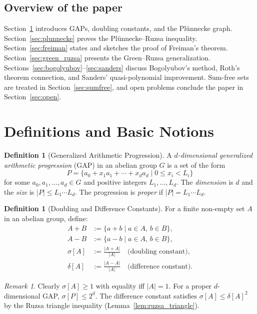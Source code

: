 \documentclass[12pt,a4paper]{amsart}
\theoremstyle{definition}
\newtheorem{definition}[theorem]{Definition}
\theoremstyle{remark}
\newtheorem{remark}[theorem]{Remark}
\begin{document}
\subsection{Overview of the paper}

Section~\ref{sec:definitions} introduces GAPs, doubling constants, and the
Plünnecke graph. Section~\ref{sec:plunnecke} proves the Plünnecke--Ruzsa
inequality. Section~\ref{sec:freiman} states and sketches the proof of Freiman's
theorem. Section~\ref{sec:green_ruzsa} presents the Green--Ruzsa generalization.
Sections~\ref{sec:bogolyubov}--\ref{sec:sanders} discuss Bogolyubov's method,
Roth's theorem connection, and Sanders' quasi-polynomial improvement. Sum-free
sets are treated in Section~\ref{sec:sumfree}, and open problems conclude the
paper in Section~\ref{sec:open}.

\section{Definitions and Basic Notions}\label{sec:definitions}

\begin{definition}[Generalized Arithmetic Progression]
A \emph{$d$-dimensional generalized arithmetic progression} (GAP) in an abelian
group $G$ is a set of the form
\[
  P = \{a_0 + x_1 a_1 + \cdots + x_d a_d \mid 0 \leq x_i < L_i\}
\]
for some $a_0, a_1, \ldots, a_d \in G$ and positive integers $L_1, \ldots, L_d$.
The \emph{dimension} is $d$ and the \emph{size} is $|P| \leq L_1 \cdots L_d$.
The progression is \emph{proper} if $|P| = L_1 \cdots L_d$.
\end{definition}

\begin{definition}[Doubling and Difference Constants]
For a finite non-empty set $A$ in an abelian group, define:
\begin{align*}
  A + B &:= \{a + b \mid a \in A,\, b \in B\}, \\
  A - B &:= \{a - b \mid a \in A,\, b \in B\}, \\
  \sigma[A] &:= \frac{|A + A|}{|A|} \quad \text{(doubling constant)}, \\
  \delta[A] &:= \frac{|A - A|}{|A|} \quad \text{(difference constant)}.
\end{align*}
\end{definition}

\begin{remark}
Clearly $\sigma[A] \geq 1$ with equality iff $|A| = 1$. For a proper $d$-dimensional
GAP, $\sigma[P] \leq 2^d$. The difference constant satisfies
$\sigma[A] \leq \delta[A]^2$ by the Ruzsa triangle inequality (Lemma~\ref{lem:ruzsa_triangle}).
\end{remark}
\end{document}
